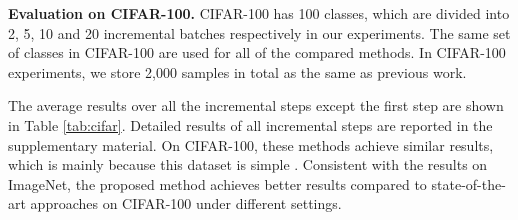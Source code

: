 \documentclass[10pt,twocolumn,letterpaper]{article}
\begin{document}
\begin{table}[t]
\centering
\caption{Class incremental learning performance (top-1 accuracy \%) on CIFAR100 with 2, 5, 10 and 20 incremental steps. The average results over all the incremental steps except the first step are reported. The best results are in bold.}
\label{tab:cifar}\end{table}

\noindent\textbf{Evaluation on CIFAR-100.}
CIFAR-100 has 100 classes, which are divided into 2, 5, 10 and 20 incremental batches respectively in our experiments. The same set of classes in CIFAR-100 are used for all of the compared methods. In CIFAR-100 experiments, we store 2,000 samples in total as the same as previous work. 

The average results over all the incremental steps except the first step are shown in Table \ref{tab:cifar}. Detailed results of all incremental steps are reported in the supplementary material. On CIFAR-100, these methods achieve similar results, which is mainly because this dataset is simple \cite{wu2019large}. Consistent with the results on ImageNet, the proposed method achieves better results compared to state-of-the-art approaches on CIFAR-100 under different settings.
\end{document}
